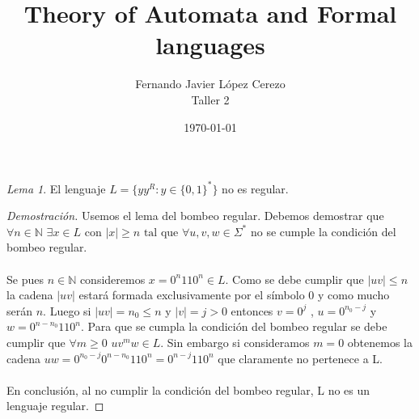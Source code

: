 \documentclass{article}
\title{Theory of Automata and Formal languages}
\author{Fernando Javier López Cerezo \\ Taller 2}
\date{\today}
\theoremstyle{remark}
\newtheorem*{lemma}{Lema}
\begin{document}
\maketitle

\begin{lemma}
El lenguaje $L=\{yy^R : y \in \{0,1\}^* \}$ no es regular.
\end{lemma}

\begin{proof}[Demostración]

Usemos el lema del bombeo regular. Debemos demostrar que $\forall n \in \mathbb{N}$ $ \exists x \in L  \text{ con } |x| \geq n \text{ tal que }  \forall u,v,w \in \Sigma^*$ no se cumple la condición del bombeo regular. \\\\ Se pues $n \in \mathbb{N}$ consideremos $x=0^n110^n 	\in L$. Como se debe cumplir que $|uv| \leq n$ la cadena $|uv|$ estará formada exclusivamente por el símbolo $0$ y como mucho serán $n$. Luego si $|uv| = n_0 \leq n$ y  $|v| = j > 0$ entonces $v = 0^{j}$ , $u = 0^{n_0-j}$ y $w=0^{n-n_0}110^n$. Para que se cumpla la condición del bombeo regular se debe cumplir que $\forall m \geq 0$  $uv^mw \in L$. Sin embargo si consideramos $m=0$ obtenemos la cadena $uw=0^{n_0-j}0^{n-n_0}110^n = 0^{n-j}110^n$ que claramente no pertenece a L. \\\\ En conclusión, al no cumplir la condición del bombeo regular, L no es un lenguaje regular. 

\end{proof}
\end{document}
